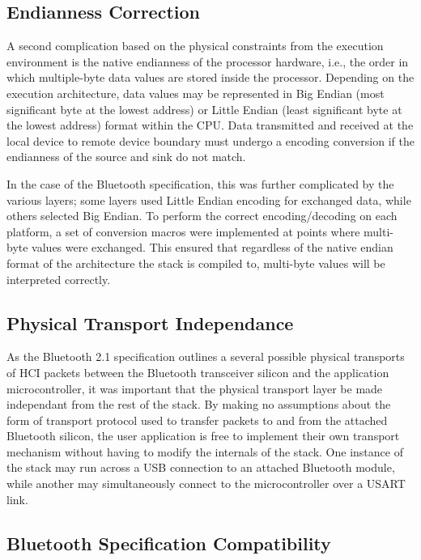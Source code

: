 \FloatBarrier
\subsection{Endianness Correction}

A second complication based on the physical constraints from the execution environment is the native endianness of the processor hardware, i.e., the order in which multiple-byte data values are stored inside the processor. Depending on the execution architecture, data values may be represented in Big Endian (most significant byte at the lowest address) or Little Endian (least significant byte at the lowest address) format within the CPU. Data transmitted and received at the local device to remote device boundary must undergo a encoding conversion if the endianness of the source and sink do not match.

In the case of the Bluetooth specification, this was further complicated by the various layers; some layers used Little Endian encoding for exchanged data, while others selected Big Endian. To perform the correct encoding/decoding on each platform, a set of conversion macros were implemented at points where multi-byte values were exchanged. This ensured that regardless of the native endian format of the architecture the stack is compiled to, multi-byte values will be interpreted correctly.

\FloatBarrier
\subsection{Physical Transport Independance}

As the Bluetooth 2.1 specification outlines a several possible physical transports of HCI packets between the Bluetooth transceiver silicon and the application microcontroller, it was important that the physical transport layer be made independant from the rest of the stack. By making no assumptions about the form of transport protocol used to transfer packets to and from the attached Bluetooth silicon, the user application is free to implement their own transport mechanism without having to modify the internals of the stack. One instance of the stack may run across a USB connection to an attached Bluetooth module, while another may simultaneously connect to the microcontroller over a USART link.

\FloatBarrier
\subsection{Bluetooth Specification Compatibility}

